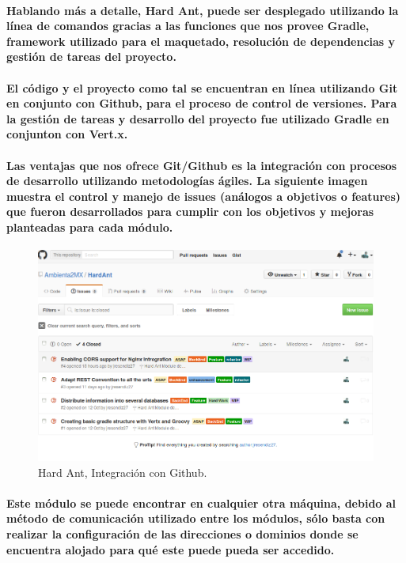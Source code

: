     \paragraph{Hablando más a detalle, Hard Ant, puede ser desplegado utilizando la línea de comandos gracias a las funciones que nos provee Gradle, framework utilizado para el maquetado, resolución de dependencias y gestión de tareas del proyecto. \cite{34}}
    \paragraph{El código y el proyecto como tal se encuentran en línea utilizando Git\cite{38} en conjunto con Github\cite{39}, para el proceso de control de versiones. Para la gestión de tareas y desarrollo del proyecto fue utilizado Gradle en conjunton con Vert.x.}
    \paragraph{Las ventajas que nos ofrece Git/Github es la integración con procesos de desarrollo utilizando metodologías ágiles. La siguiente imagen muestra el control y manejo de issues (análogos a objetivos o features) que fueron desarrollados para cumplir con los objetivos y mejoras planteadas para cada módulo.}
    \begin{figure}[h!]
        \centering
          \includegraphics[width=\textwidth]{./images/HardAntIssues.png}
          \caption{Hard Ant, Integración con Github.}
    \end{figure}
    \paragraph{Este módulo se puede encontrar en cualquier otra máquina, debido al método de comunicación utilizado entre los módulos, sólo basta con realizar la configuración de las direcciones o dominios donde se encuentra alojado para qué este puede pueda ser accedido.}
